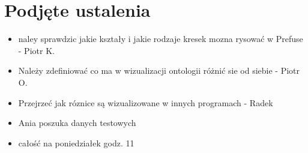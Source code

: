 \documentclass[a4paper,10pt]{article}
\begin{document}
\section{Podjęte ustalenia}
\begin{itemize}
 \item naley sprawdzic jakie kształy i jakie rodzaje kresek mozna rysować w Prefuse - Piotr K.
\item Należy zdefiniować co ma w wizualizacji ontologii różnić sie od siebie - Piotr O.
\item Przejrzeć jak róznice są wizualizowane w innych programach - Radek
\item Ania poszuka danych testowych	
 \item całość na poniedziałek godz. 11
\end{itemize}


\newpage
\tableofcontents
\newpage


\clearpage
{}
{}

\end{document}
